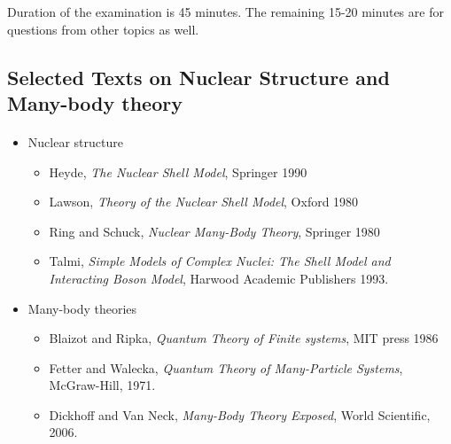 \documentclass[%
twoside,                 %
final,                   %
10pt]{article}
\begin{document}
\noindent
Duration of the examination is 45 minutes. The remaining 15-20 minutes are for questions from other topics as well.




\subsection*{Selected Texts on Nuclear Structure and Many-body theory}

\paragraph{}
\begin{itemize}
\item Nuclear structure
\begin{itemize}

 \item Heyde, \emph{The Nuclear Shell Model}, Springer 1990

 \item Lawson, \emph{Theory of the Nuclear Shell Model}, Oxford 1980

 \item Ring and Schuck, \emph{Nuclear Many-Body Theory}, Springer 1980

 \item Talmi, \emph{Simple Models of Complex Nuclei: The Shell Model and Interacting Boson Model}, Harwood Academic Publishers 1993.

\end{itemize}

\noindent
\item Many-body theories
\begin{itemize}

 \item Blaizot and Ripka, \emph{Quantum Theory of Finite systems}, MIT press 1986

 \item Fetter and Walecka, \emph{Quantum Theory of Many-Particle Systems}, McGraw-Hill, 1971.

 \item Dickhoff and Van Neck, \emph{Many-Body Theory Exposed}, World Scientific, 2006.
\end{itemize}

\noindent
\end{itemize}

\noindent
\end{document}
